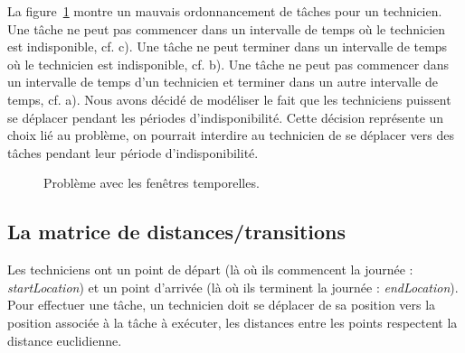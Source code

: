 La figure~\ref{fig:badTW} montre un mauvais ordonnancement de tâches  pour un technicien.
Une tâche ne peut pas commencer dans un intervalle de temps où le technicien est indisponible, cf. c).
Une tâche ne peut terminer dans un intervalle de temps où le technicien est indisponible, cf. b). 
Une tâche ne peut pas commencer dans un intervalle de temps d'un technicien et terminer dans un autre intervalle de temps, cf. a). 
Nous avons décidé de modéliser le fait que les techniciens puissent se déplacer pendant les périodes d'indisponibilité.
Cette décision représente un choix lié au problème, on pourrait interdire au technicien de se déplacer vers des tâches pendant leur période d'indisponibilité. 
\begin{figure}[H]
\centering
{}
\caption{Problème avec les fenêtres temporelles.\label{fig:badTW}}
\end{figure}


\subsection{La matrice de distances/transitions}
Les techniciens ont un point de départ (là où ils commencent la journée : \textit{startLocation}) et un point d'arrivée (là où ils terminent la journée : \textit{endLocation}).
Pour effectuer une tâche, un technicien doit se déplacer de sa position vers la position associée à la tâche à exécuter, les distances entre les points respectent la distance euclidienne.

